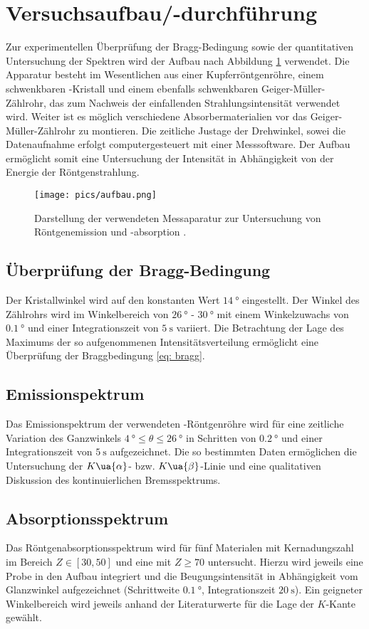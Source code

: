 \section{Versuchsaufbau/-durchführung}
Zur experimentellen Überprüfung der Bragg-Bedingung sowie der quantitativen Untersuchung der Spektren wird der Aufbau nach Abbildung
\ref{fig: aufbau} verwendet. Die Apparatur besteht im Wesentlichen aus einer Kupferröntgenröhre, einem schwenkbaren -Kristall
und einem ebenfalls schwenkbaren Geiger-Müller-Zählrohr, das zum Nachweis der einfallenden Strahlungsintensität verwendet wird.
Weiter ist es möglich verschiedene Absorbermaterialien vor das Geiger-Müller-Zählrohr
zu montieren. Die zeitliche Justage der Drehwinkel, sowei die Datenaufnahme erfolgt computergesteuert mit einer
Messsoftware. Der Aufbau ermöglicht somit eine Untersuchung der Intensität in Abhängigkeit von der Energie
der Röntgenstrahlung.
\begin{figure}
  \centering
  \texttt{[image: pics/aufbau.png]}
  \caption{Darstellung der verwendeten Messaparatur zur Untersuchung von Röntgenemission und -absorption \cite{anleitung602}.}
  \label{fig: aufbau}
\end{figure}
\subsection{Überprüfung der Bragg-Bedingung}
Der Kristallwinkel wird auf den konstanten Wert $\SI{14}{\degree}$ eingestellt. Der Winkel des Zählrohrs wird im Winkelbereich
von $\SI{26}{\degree}$ - $\SI{30}{\degree}$ mit einem Winkelzuwachs von $\SI{0.1}{\degree}$ und einer Integrationszeit
von $\SI{5}{\second}$ variiert. Die Betrachtung der Lage des Maximums der so aufgenommenen Intensitätsverteilung ermöglicht eine Überprüfung
der Braggbedingung \ref{eq: bragg}.

\subsection{Emissionspektrum}
Das Emissionspektrum der verwendeten -Röntgenröhre wird für eine zeitliche Variation des Ganzwinkels
$\SI{4}{\degree} \leq \theta \leq \SI{26}{\degree}$ in Schritten von $\SI{0.2}{\degree}$ und einer Integrationszeit
von $\SI{5}{\second}$ aufgezeichnet. Die so bestimmten Daten ermöglichen die Untersuchung der $K\ua{\alpha}$- bzw.
$K\ua{\beta}$-Linie und eine qualitativen Diskussion des kontinuierlichen Bremsspektrums.

\subsection{Absorptionsspektrum}
Das Röntgenabsorptionsspektrum wird für fünf Materialen mit Kernadungszahl im Bereich $Z \in \left[30, 50 \right]$ und eine
mit $Z \geq 70$ untersucht. Hierzu wird jeweils eine Probe in den Aufbau integriert und die Beugungsintensität in Abhängigkeit
vom Glanzwinkel aufgezeichnet (Schrittweite $\SI{0.1}{\degree}$, Integrationszeit $\SI{20}{\second}$).
Ein geigneter Winkelbereich wird jeweils anhand der Literaturwerte für die Lage der $K$-Kante gewählt.
